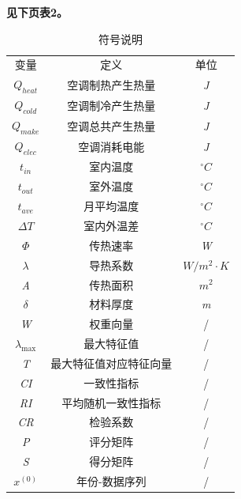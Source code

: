 \documentclass[a4paper, 12pt]{article}
\numberwithin{equation}{section}
\begin{document}
    {}
        \textbf{见下页表2。}
        \begin{table}[htbp]
            \centering
            \caption{符号说明}
            \begin{tabular}{c c c}
                \hline \hline \noalign{\smallskip}
                变量 & 定义 & 单位 \\
                \noalign{\smallskip} \hline \noalign{\smallskip}
                $ Q_{heat} $ & 空调制热产生热量 & \textit{J} \\
                $ Q_{cold} $ & 空调制冷产生热量 & \textit{J} \\
                $ Q_{make} $ & 空调总共产生热量 & \textit{J} \\
                $ Q_{elec} $ & 空调消耗电能 & \textit{J} \\
                $ t_{in} $ & 室内温度 & $ ^{\circ}C $ \\
                $ t_{out} $ & 室外温度 & $ ^{\circ}C $ \\
                $ t_{ave} $ & 月平均温度 & $ ^{\circ}C $ \\
                $ \Delta T $ & 室内外温差 & $ ^{\circ}C $ \\
                $ \Phi $ & 传热速率 & \textit{W} \\
                $ \lambda $ & 导热系数 & $ W / m^{2} \cdot K $ \\
                \textit{A} & 传热面积 & $ m^{2} $ \\
                $ \delta $ & 材料厚度 & \textit{m} \\
                \textit{W} & 权重向量 & / \\
                $ \lambda _{\max} $ & 最大特征值 & / \\
                \textit{T} & 最大特征值对应特征向量 & / \\
                \textit{CI} & 一致性指标 & / \\
                \textit{RI} & 平均随机一致性指标 & / \\
                \textit{CR} & 检验系数 & / \\
                \textit{P} & 评分矩阵 & / \\
                \textit{S} & 得分矩阵 & / \\
                $ x^{ (0)} $ & 年份-数据序列 & / \\

\end{tabular}
\end{table}
\end{document}
